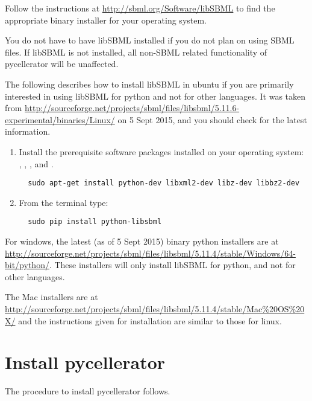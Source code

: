 Follow the instructions at \href{http://sbml.org/Software/libSBML}{http://sbml.org/Software/libSBML} to find the appropriate binary installer for your operating system. 

You do not have to have libSBML installed if you do not plan on using SBML files. If libSBML is not installed, all non-SBML related functionality of pycellerator will be unaffected. 

The following describes how to install libSBML in ubuntu if you are primarily interested in using libSBML for python and not for other languages. It was taken from \url{http://sourceforge.net/projects/sbml/files/libsbml/5.11.6-experimental/binaries/Linux/} on 5 Sept 2015, and you should check for the latest information. 

\begin{enumerate}
\item Install the  prerequisite software packages installed on your operating system: , , , and .
\begin{lstlisting}
  sudo apt-get install python-dev libxml2-dev libz-dev libbz2-dev
\end{lstlisting}
\item From the terminal type:
\begin{lstlisting}
  sudo pip install python-libsbml
\end{lstlisting}
\end{enumerate}

For windows, the latest (as of 5 Sept 2015) binary python installers are at \url{http://sourceforge.net/projects/sbml/files/libsbml/5.11.4/stable/Windows/64-bit/python/}. These installers will only install libSBML for python, and not for other languages. 

The Mac installers are at \url{http://sourceforge.net/projects/sbml/files/libsbml/5.11.4/stable/Mac\%20OS\%20X/} and the instructions given for installation are similar to those for linux.

\section{Install pycellerator}

The procedure to install pycellerator follows. 

  

